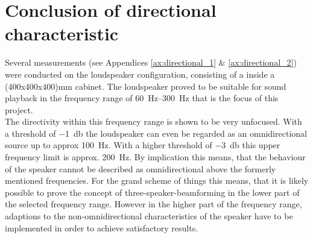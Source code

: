 \section{Conclusion of directional characteristic}
Several measurements (see Appendices \ref{ax:directional_1} \& \ref{ax:directional_2}) were conducted on the loudspeaker configuration, consisting of a \citep{seas33} inside a (400x400x400)\si{\milli\meter} cabinet. The loudspeaker proved to be suitable for sound playback in the frequency range of \SIrange{60}{300}{\hertz} that is the focus of this project.\\
The directivity within this frequency range is shown to be very unfocused. With a threshold of \SI{-1}{\decibel} the loudspeaker can even be regarded as an omnidirectional source up to approx \SI{100}{\hertz}. With a higher threshold of \SI{-3}{\decibel} this upper frequency limit is approx. \SI{200}{\hertz}. By implication this means, that the behaviour of the speaker cannot be described as omnidirectional above the formerly mentioned frequencies.
For the grand scheme of things this means, that it is likely possible to prove the concept of three-speaker-beamforming in the lower part of the selected frequency range. However in the higher part of the frequency range, adaptions to the non-omnidirectional characteristics of the speaker have to be implemented in order to achieve satisfactory results.